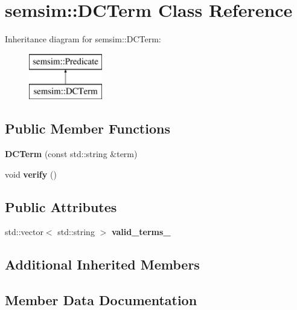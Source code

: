 \hypertarget{classsemsim_1_1DCTerm}{}\section{semsim\+:\+:D\+C\+Term Class Reference}
\label{classsemsim_1_1DCTerm}
Inheritance diagram for semsim\+:\+:D\+C\+Term\+:\begin{figure}[H]
\begin{center}
\leavevmode
\includegraphics[height=2.000000cm]{classsemsim_1_1DCTerm}
\end{center}
\end{figure}
\subsection*{Public Member Functions}
\begin{DoxyCompactItemize}
\item 
\mbox{\label{classsemsim_1_1DCTerm_a7ad576d21a2b4ddca2de1123fc9f5cd1}} 
{\bfseries D\+C\+Term} (const std\+::string \&term)
\item 
\mbox{\label{classsemsim_1_1DCTerm_a37a0aeaee6980ec00d51e686f0bd551b}} 
void {\bfseries verify} ()
\end{DoxyCompactItemize}
\subsection*{Public Attributes}
\begin{DoxyCompactItemize}
\item 
std\+::vector$<$ std\+::string $>$ {\bfseries valid\+\_\+terms\+\_\+}
\end{DoxyCompactItemize}
\subsection*{Additional Inherited Members}


\subsection{Member Data Documentation}
\mbox{\label{classsemsim_1_1DCTerm_a09e8c38dd1a51c893ed92cca2e675475}} 
